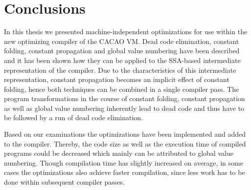 \section{Conclusions}
\label{sec:conclusions}

In this thesis we presented machine-independent optimizations for use within the new optimizing compiler of the CACAO VM. Dead code elimination, constant folding, constant propagation and global value numbering have been described and it has been shown how they can be applied to the SSA-based intermediate representation of the compiler. Due to the characteristics of this intermediate representation, constant propagation becomes an implicit effect of constant folding, hence both techniques can be combined in a single compiler pass. The program transformations in the course of constant folding, constant propagation as well as global value numbering inherently lead to dead code and thus have to be followed by a run of dead code elimination.

Based on our examinations the optimizations have been implemented and added to the compiler. Thereby, the code size as well as the execution time of compiled programs could be decreased which mainly can be attributed to global value numbering. Though compilation time has slightly increased on average, in some cases the optimizations also achieve faster compilation, since less work has to be done within subsequent compiler passes.
